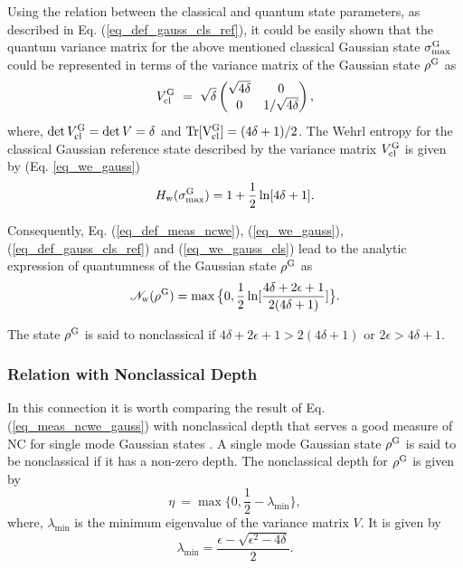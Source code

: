 \documentclass[letter,scriptaddress,twocolumn,prl,showkeys]{revtex4}
\begin{document}
Using the relation between the classical and quantum state parameters, as described in Eq. (\ref{eq_def_gauss_cls_ref}), it could be easily shown that the quantum variance matrix for the above mentioned classical Gaussian state $\sigma^{\rm{G}}_{\max}$ could be represented in terms of the variance matrix of the Gaussian state $\rho^{\rm{G}}$ as
\begin{equation}
V^{\rm{G}}_{\rm{cl}}~=~\sqrt{\delta}\begin{pmatrix}
\sqrt{4\delta} & 0\\
0 & 1/\sqrt{4\delta}
\end{pmatrix},
\label{eq_vm_cls_ref}
\end{equation}
where, $\det V^{\rm{G}}_{\rm{cl}}=\det V=\delta$ and $\rm{Tr}[V^{\rm{G}}_{\rm{cl}}]=(4\delta+1)/2$.
The Wehrl entropy for the classical Gaussian reference state described by the variance matrix $V^{\rm{G}}_{\rm{cl}}$ is given by (Eq. \ref{eq_we_gauss})
\begin{equation}
H_{\rm{w}}(\sigma^{\rm{G}}_{\max})=1+\frac{1}{2}\ln[4\delta+1].
\label{eq_we_gauss_cls}
\end{equation}

Consequently, Eq. (\ref{eq_def_meas_ncwe}), (\ref{eq_we_gauss}), (\ref{eq_def_gauss_cls_ref}) and (\ref{eq_we_gauss_cls}) lead to the analytic expression of quantumness of the Gaussian state $\rho^{\rm{G}}$ as
\begin{equation}
\mathscr{N}_{\rm{w}}(\rho^{\rm{G}})=\max\big\lbrace 0,\frac{1}{2}\ln[\frac{4\delta+2\epsilon+1}{2(4\delta+1)}]\big\rbrace.
\label{eq_meas_ncwe_gauss}
\end{equation}

The state $\rho^{\rm{G}}$ is said to nonclassical if $4\delta+2\epsilon+1>2(4\delta+1)$ or $2\epsilon> 4\delta+1$.

\subsubsection*{\bf Relation with Nonclassical Depth}

In this connection it is worth comparing the result of Eq. (\ref{eq_meas_ncwe_gauss}) with nonclassical depth \cite{ncm_depth_lee} that serves a good measure of NC for single mode Gaussian states \cite{ncm_depth_crit_barnett}. 
A single mode Gaussian state $\rho^{\rm{G}}$ is said to be nonclassical if it has a non-zero depth. 
The nonclassical depth for $\rho^{\rm{G}}$ is given by
\begin{equation}
\eta~=\max\big\lbrace 0, \frac{1}{2}-\lambda_{\min}\big\rbrace,
\label{eq_def_depth_gauss}
\end{equation}
where, $\lambda_{\min}$ is the minimum eigenvalue of the variance matrix $V$.
It is given by
\begin{equation}
\lambda_{\min}=\frac{\epsilon-\sqrt{\epsilon^{2}-4\delta}}{2}.
\label{eq_def_lmin_vm_gauss}
\end{equation}
\end{document}
